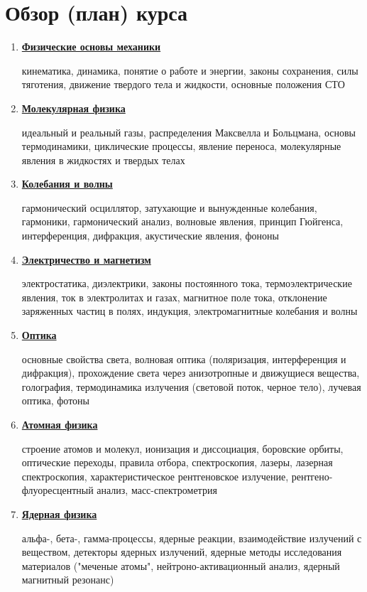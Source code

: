 
\section{Обзор (план) курса}
\begin{enumerate}
\item{\underline{\bf Физические основы механики}}

кинематика, динамика, понятие о работе и энергии, законы сохранения, силы тяготения, движение твердого тела и жид\-кости, основные положения СТО
\item{\underline{\bf Молекулярная физика}}

идеальный и реальный газы, распределения Максвелла и Больцмана, основы термодинамики, циклические процес\-сы, явление переноса, молекулярные явления в жидкостях и твердых телах

\item{\underline{\bf Колебания и волны}}

гармонический осциллятор, затухающие и вынужденные ко\-лебания, гармоники, гармонический анализ, волновые явле\-ния, принцип Гюйгенса, интерференция, дифракция, аку\-стические явления, фононы
\item{\underline{\bf	Электричество и магнетизм}}

электростатика, диэлектрики, законы постоянного тока, тер\-моэлектрические явления, ток в электролитах и газах, маг\-нитное поле тока, отклонение заряженных частиц в полях, индукция, электромагнитные колебания и волны

\item{\underline{\bf	Оптика}}

основные свойства света, волновая оптика (поляризация, интерференция и дифракция), прохождение света через ан\-изотропные и движущиеся вещества, голография, термоди\-намика излучения (световой поток, черное тело), лучевая оптика, фотоны

\item{\underline{\bf	Атомная физика}}

строение атомов и молекул, ионизация и диссоциация, боро\-вские орбиты, оптические переходы, правила отбора, спек\-троскопия, лазеры, лазерная спектроскопия, характеристи\-ческое рентгеновское излучение, рентгено-флуоресцентный анализ, масс-спектрометрия

\item{\underline{\bf	Ядерная физика}}

альфа-, бета-, гамма-процессы, ядерные реакции, взаимо\-действие излучений с веществом, детекторы ядерных излу\-чений, ядерные методы исследования материалов ("мече\-ные атомы", нейтроно-акти\-вационный анализ, ядерный ма\-гнитный резонанс)

\end{enumerate}


